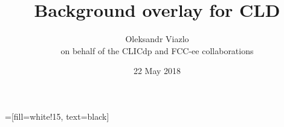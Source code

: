 \documentclass[8pt]{beamer}
\newif\ifplacelogo %
\begin{document}
\newcommand{\myNode}{\tikz[baseline,inner sep=1pt] \node[anchor=base]}

 =[fill=white!15, text=black]



\title[Background overlay for CLD \hspace{14.0em}\insertframenumber/
\inserttotalframenumber]{ Background overlay for CLD}


	\author[Oleksandr Viazlo]{Oleksandr Viazlo\\ 
	{\small on behalf of the CLICdp and FCC-ee collaborations}
	}
	
       
	\date{22 May 2018}


	

   	

\placelogofalse
\end{document}
